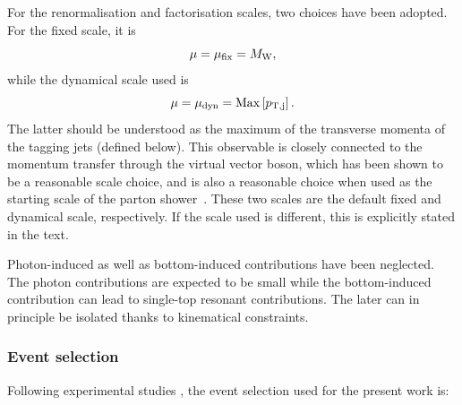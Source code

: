 \documentclass[11pt]{cernrep}
\begin{document}
For the renormalisation and factorisation scales, two choices have been adopted.
For the fixed scale, it is
%
\begin{equation}
 \mu = \mu_{\rm fix} = M_{\rm W},
\end{equation}
%
while the dynamical scale used is
%
\begin{equation}
 \mu = \mu_{\rm dyn} = {\rm Max}\left[p_{\rm T, j}\right].
\end{equation}
%
The latter should be understood as the maximum of the transverse momenta of the tagging jets (defined below).
This observable is closely connected to the momentum transfer through
the virtual vector boson, which has been shown to be a reasonable scale
choice, and is also a reasonable choice when used as the starting scale
of the parton shower~\cite{Rauch:2016upa}.
These two scales are the default fixed and dynamical scale, respectively.
If the scale used is different, this is explicitly stated in the text.

Photon-induced as well as bottom-induced contributions have been neglected.
The photon contributions are expected to be small \cite{Biedermann:2017bss} while the bottom-induced contribution can lead to single-top resonant contributions.
The later can in principle be isolated thanks to kinematical constraints.

\subsubsection*{Event selection}

Following experimental studies \cite{Aad:2016ett,CMS-PAS-SMP-14-008}, the event selection used for the present work is:
\end{document}
